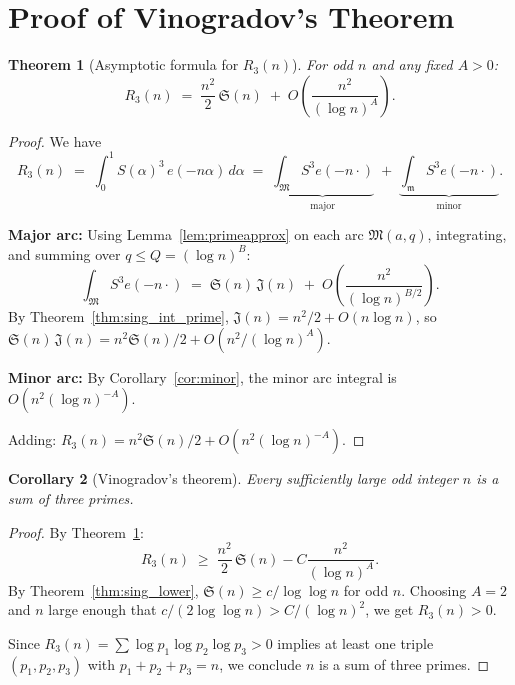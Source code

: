 \documentclass[12pt,a4paper]{amsart}
\newtheorem{theorem}{Theorem}[section]
\newtheorem{corollary}[theorem]{Corollary}
\theoremstyle{definition}
\newcommand{\eq}[1]{e\!\left(#1\right)}
\begin{document}
\section{Proof of Vinogradov's Theorem}
\label{sec:proof}

\begin{theorem}[Asymptotic formula for $R_3(n)$]\label{thm:asymptotic}
  For odd $n$ and any fixed $A > 0$:
  \[
    R_3(n)
    \;=\; \frac{n^2}{2}\, \mathfrak{S}(n)
          \;+\; O\!\left(\frac{n^2}{(\log n)^A}\right).
  \]
\end{theorem}

\begin{proof}
  We have
  \[
    R_3(n) \;=\; \int_0^1 S(\alpha)^3\, \eq{-n\alpha}\, d\alpha
    \;=\; \underbrace{\int_{\mathfrak{M}} S^3 \eq{-n\cdot}}_{\text{major}}
          \;+\; \underbrace{\int_{\mathfrak{m}} S^3 \eq{-n\cdot}}_{\text{minor}}.
  \]

  \textbf{Major arc:}
  Using Lemma~\ref{lem:primeapprox} on each arc $\mathfrak{M}(a,q)$,
  integrating, and summing over $q \leq Q = (\log n)^B$:
  \[
    \int_{\mathfrak{M}} S^3 \eq{-n\cdot}
    \;=\; \mathfrak{S}(n)\, \mathfrak{J}(n)
          \;+\; O\!\left(\frac{n^2}{(\log n)^{B/2}}\right).
  \]
  By Theorem~\ref{thm:sing_int_prime}, $\mathfrak{J}(n) = n^2/2 + O(n\log n)$,
  so $\mathfrak{S}(n)\, \mathfrak{J}(n) = n^2 \mathfrak{S}(n)/2 + O(n^2/(\log n)^A)$.

  \textbf{Minor arc:}
  By Corollary~\ref{cor:minor}, the minor arc integral is
  $O(n^2 (\log n)^{-A})$.

  Adding: $R_3(n) = n^2 \mathfrak{S}(n)/2 + O(n^2(\log n)^{-A})$.
\end{proof}

\begin{corollary}[Vinogradov's theorem]\label{cor:vinogradov}
  Every sufficiently large odd integer $n$ is a sum of three primes.
\end{corollary}

\begin{proof}
  By Theorem~\ref{thm:asymptotic}:
  \[
    R_3(n) \;\geq\; \frac{n^2}{2}\, \mathfrak{S}(n)
                    - C \frac{n^2}{(\log n)^A}.
  \]
  By Theorem~\ref{thm:sing_lower}, $\mathfrak{S}(n) \geq c/\log\log n$
  for odd $n$.  Choosing $A = 2$ and $n$ large enough that
  $c/(2\log\log n) > C/(\log n)^2$, we get $R_3(n) > 0$.

  Since $R_3(n) = \sum \log p_1 \log p_2 \log p_3 > 0$
  implies at least one triple $(p_1, p_2, p_3)$ with $p_1+p_2+p_3 = n$,
  we conclude $n$ is a sum of three primes.
\end{proof}
\end{document}

